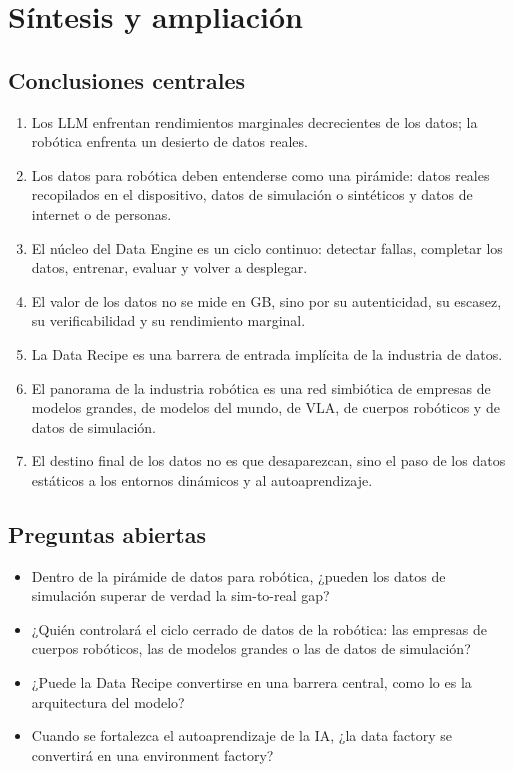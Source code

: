\section{Síntesis y ampliación}

\subsection{Conclusiones centrales}

\begin{enumerate}
\item Los LLM enfrentan rendimientos marginales decrecientes de los datos; la robótica enfrenta un desierto de datos reales.
\item Los datos para robótica deben entenderse como una pirámide: datos reales recopilados en el dispositivo, datos de simulación o sintéticos y datos de internet o de personas.
\item El núcleo del Data Engine es un ciclo continuo: detectar fallas, completar los datos, entrenar, evaluar y volver a desplegar.
\item El valor de los datos no se mide en GB, sino por su autenticidad, su escasez, su verificabilidad y su rendimiento marginal.
\item La Data Recipe es una barrera de entrada implícita de la industria de datos.
\item El panorama de la industria robótica es una red simbiótica de empresas de modelos grandes, de modelos del mundo, de VLA, de cuerpos robóticos y de datos de simulación.
\item El destino final de los datos no es que desaparezcan, sino el paso de los datos estáticos a los entornos dinámicos y al autoaprendizaje.
\end{enumerate}

\subsection{Preguntas abiertas}

\begin{itemize}
\item Dentro de la pirámide de datos para robótica, ¿pueden los datos de simulación superar de verdad la sim-to-real gap?
\item ¿Quién controlará el ciclo cerrado de datos de la robótica: las empresas de cuerpos robóticos, las de modelos grandes o las de datos de simulación?
\item ¿Puede la Data Recipe convertirse en una barrera central, como lo es la arquitectura del modelo?
\item Cuando se fortalezca el autoaprendizaje de la IA, ¿la data factory se convertirá en una environment factory?
\end{itemize}

